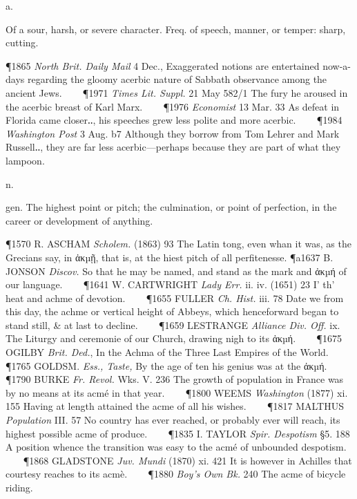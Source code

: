 \begin{description}[wide, labelwidth=!, labelindent=0pt]
  a.

\noindent {}

\noindent  [f. L. acerb-us + -ic.] 

\noindent
Of a sour, harsh, or severe character. Freq. of speech, manner, or temper:
sharp, cutting. 

\P 1865 \textit{North Brit. Daily Mail} 4 Dec., Exaggerated notions are entertained
now-a-days regarding the gloomy acerbic nature of Sabbath observance among the
ancient Jews.    
\P 1971 \textit{Times Lit. Suppl.} 21 May 582/1 The fury he aroused in the
acerbic breast of Karl Marx.    
\P 1976 \textit{Economist} 13 Mar. 33 As defeat in Florida
came closer‥, his speeches grew less polite and more acerbic.    
\P 1984 \textit{Washington Post} 3 Aug. b7 Although they borrow from Tom 
Lehrer and Mark Russell‥, they are
far less acerbic—perhaps because they are part of what they lampoon.

  n.

\noindent {}

\vspace{-0.3cm}

\begin{myenumerate}
 gen. The highest point or pitch; the culmination, or point of perfection, in
the career or development of anything. 

\P 1570 R. ASCHAM \textit{Scholem.} (1863) 93 The Latin tong, even whan it was, as the
Grecians say, in ἀκµῇ, that is, at the hiest pitch of all perfitenesse.
\P a1637 B. JONSON \textit{Discov.} So that he may be named, and stand as the mark and
ἀκµή of our language.    
\P 1641 W. CARTWRIGHT \textit{Lady Err.} ii. iv. (1651) 23 I' th'
heat and achme of devotion.    
\P 1655 FULLER \textit{Ch. Hist.} iii. 78 Date we from this
day, the achme or vertical height of Abbeys, which henceforward began to stand
still, \& at last to decline.    
\P 1659 LESTRANGE \textit{Alliance Div. Off.} ix. The
Liturgy and ceremonie of our Church, drawing nigh to its ἀκµή.    
\P 1675 OGILBY \textit{Brit. Ded.}, In the Achma of the Three Last Empires of the World.    
\P 1765 GOLDSM. \textit{Ess., Taste,} By the age of ten his genius was at the ἀκµή.    
\P 1790 BURKE \textit{Fr. Revol.} Wks. V. 236 The growth of population in France 
was by no means at its acmé in that year.    
\P 1800 WEEMS \textit{Washington} (1877) xi. 155 Having at length
attained the acme of all his wishes.    
\P 1817 MALTHUS \textit{Population} III. 57 No
country has ever reached, or probably ever will reach, its highest possible acme
of produce.    
\P 1835 I. TAYLOR \textit{Spir. Despotism} §5. 188 A position whence the
transition was easy to the acmé of unbounded despotism.    
\P 1868 GLADSTONE \textit{Juv. Mundi} (1870) xi. 421 It is however in Achilles 
that courtesy reaches to its acmè.    
\P 1880 \textit{Boy's Own Bk.} 240 The acme of bicycle riding.


\end{myenumerate}
\end{description}
